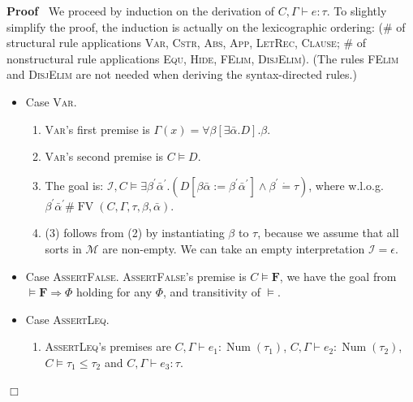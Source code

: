 \documentclass{article}
\newcommand{\assign}{:=}
\newcommand{\tmmathbf}[1]{\ensuremath{\boldsymbol{#1}}}
\newcommand{\tmname}[1]{\textsc{#1}}
\newcommand{\tmop}[1]{\ensuremath{\operatorname{#1}}}
\newenvironment{proof}{\noindent\textbf{Proof\ }}{\hspace*{\fill}$\Box$\medskip}
\begin{document}
\begin{proof}
  We proceed by induction on the derivation of $C, \Gamma \vdash e : \tau$. To
  slightly simplify the proof, the induction is actually on the lexicographic
  ordering: (\# of structural rule applications {\tmname{Var}},
  {\tmname{Cstr}}, {\tmname{Abs}}, {\tmname{App}}, {\tmname{LetRec}},
  {\tmname{Clause}}; \# of nonstructural rule applications {\tmname{Equ}},
  {\tmname{Hide}}, {\tmname{FElim}}, {\tmname{DisjElim}}). (The rules
  {\tmname{FElim}} and {\tmname{DisjElim}} are not needed when deriving the
  syntax-directed rules.)
  \begin{itemize}
    \item Case {\tmname{Var}}.
    \begin{enumerate}
      \item {\tmname{Var}}'s first premise is $\Gamma (x) = \forall \beta
      [\exists \bar{\alpha} .D] . \beta$.
      
      \item {\tmname{Var}}'s second premise is $C \vDash D$.
      
      \item The goal is: $\mathcal{I}, C \vDash \exists \beta^{\prime}
      \bar{\alpha}^{\prime} . (D [\beta \bar{\alpha} \assign \beta^{\prime}
      \bar{\alpha}^{\prime}] \wedge \beta^{\prime} \dot{=} \tau)$, where
      w.l.o.g. $\beta^{\prime} \bar{\alpha}^{\prime} \# \tmop{FV} (C, \Gamma,
      \tau, \beta, \bar{\alpha})$.
      
      \item (3) follows from (2) by instantiating $\beta$ to $\tau$, because
      we assume that all sorts in $\mathcal{M}$ are non-empty. We can take an
      empty interpretation $\mathcal{I}= \epsilon$.
    \end{enumerate}
    \item Case {\tmname{AssertFalse}}. {\tmname{AssertFalse}}'s premise is $C
    \vDash \tmmathbf{F}$, we have the goal from $\vDash \tmmathbf{F}
    \Rightarrow \Phi$ holding for any $\Phi$, and transitivity of $\vDash$.
    
    \item Case {\tmname{AssertLeq}}.
    \begin{enumerate}
      \item {\tmname{AssertLeq}}'s premises are $C, \Gamma \vdash e_1 :
      \tmop{Num} (\tau_1)$, $C, \Gamma \vdash e_2 : \tmop{Num} (\tau_2)$, $C
      \vDash \tau_1 \leq \tau_2$ and $C, \Gamma \vdash e_3 : \tau$.
      

\end{enumerate}
\end{itemize}
\end{proof}
\end{document}
